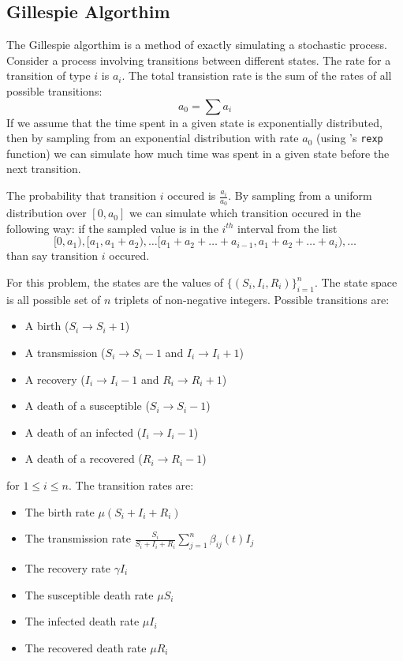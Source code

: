 \documentclass{article}\usepackage[]{graphicx}\usepackage[]{color}
\begin{document}
\subsection{Gillespie Algorthim} 
The Gillespie algorthim is a method of exactly simulating a stochastic process. Consider a process involving transitions between different states. The rate for a transition of type $i$ is $a_i$. The total transistion rate is the sum of the rates of all possible transitions:
\begin{equation}
a_0 = \sum a_i
\end{equation}
If we assume that the time spent in a given state is exponentially distributed, then by sampling from an exponential distribution with rate $a_0$ (using \Rlogo's \verb|rexp| function) we can simulate how much time was spent in a given state before the next transition. \par
The probability that transition $i$ occured is $\frac{a_i}{a_0}$. By sampling from a uniform distribution over $[0,a_0]$ we can simulate which transition occured in the following way: if the sampled value is in the $i^{th}$ interval from the list
\begin{equation}
[0,a_1), [a_1,a_1+a_2), \dots [a_1+a_2+\dots+a_{i-1},a_1+a_2+\dots+a_{i}), \dots
\end{equation}
than say transition $i$ occured. 
\par
For this problem, the states are the values of $\{ (S_i,I_i,R_i) \}_{i=1}^n$. The state space is all possible set of $n$ triplets of non-negative integers. Possible transitions are: 
\begin{itemize}
\item A birth ($S_i \rightarrow S_i+1$)
\item A transmission ($S_i \rightarrow S_i-1$ and $I_i \rightarrow I_i+1$)
\item A recovery ($I_i \rightarrow I_i-1$ and $R_i \rightarrow R_i+1$)
\item A death of a susceptible ($S_i \rightarrow S_i-1$)
\item A death of an infected ($I_i \rightarrow I_i-1$)
\item A death of a recovered ($R_i \rightarrow R_i-1$)
\end{itemize}
for $1 \leq i \leq n$. The transition rates are:
\begin{itemize}
\item The birth rate $\mu(S_i + I_i + R_i)$
\item The transmission rate $\frac{S_i}{S_i+I_i+R_i}\sum\limits_{j=1}^{n}\beta_{ij}(t) I_j$
\item The recovery rate $\gamma I_i $
\item The susceptible death rate $\mu S_i $
\item The infected death rate $\mu I_i $
\item The recovered death rate $\mu R_i $
\end{itemize}
\end{document}
